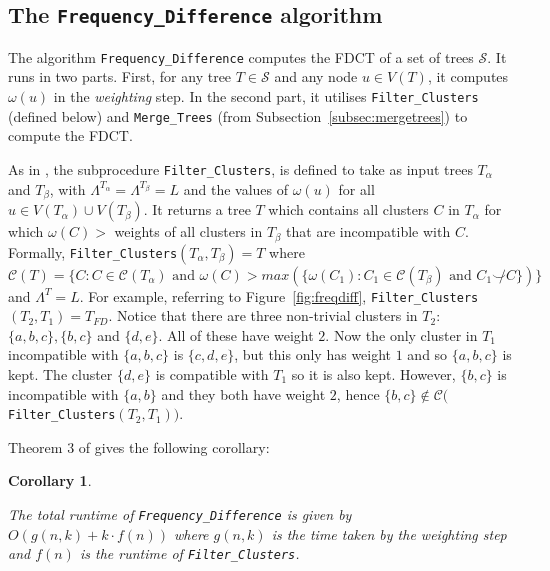 \documentclass{article}
\newcommand{\compatible}{\smile}
\newcommand{\leafset}{\Lambda}
\newcommand{\weight}{\omega}
\newcommand{\TA}{T_\alpha}
\newcommand{\TB}{T_\beta}
\newtheorem{freqdiffruntimecomponents}[incompatibility]{Corollary}
\begin{document}
    \subsection{The \texttt{Frequency\_Difference} algorithm}

    The algorithm \texttt{Frequency\_Difference} \cite{jansson2018algorithms} computes the FDCT of a set of trees $\mathcal{S}$. It runs in two parts. First, for any tree $T \in \mathcal{S}$ and any node $u \in V(T)$, it computes $\weight(u)$ in the \textit{weighting} step. In the second part, it utilises \texttt{Filter\_Clusters} (defined below) and \texttt{Merge\_Trees} (from Subsection~\ref{subsec:mergetrees}) to compute the FDCT.

    As in \cite{jansson2018algorithms}, the subprocedure \texttt{Filter\_Clusters}, is defined to take as input trees $\TA$ and $\TB$, with $\leafset^{\TA} = \leafset^{\TB} = L$ and the values of $\weight(u)$ for all $u \in V(\TA) \cup V(\TB)$. It returns a tree $T$ which contains all clusters $C$ in $\TA$ for which $\weight(C) > $ weights of all clusters in $\TB$ that are incompatible with $C$. Formally, \texttt{Filter\_Clusters}$(\TA, \TB) = T$ where $\mathcal{C}(T) = \{C : C \in \mathcal{C}(\TA) \text{ and } \weight(C) > max(\{\weight(C_1) : C_1 \in \mathcal{C}(\TB) \text{ and } C_1 \not\compatible C\})\}$ and $\leafset^T = L$. For example, referring to Figure~\ref{fig:freqdiff}, \texttt{Filter\_Clusters}$(T_2, T_1) = T_{FD}$. Notice that there are three non-trivial clusters in $T_2$: $\{a, b, c\}, \{b, c\}$ and $\{d, e\}$. All of these have weight $2$. Now the only cluster in $T_1$ incompatible with $\{a, b, c\}$ is $\{c, d, e\}$, but this only has weight $1$ and so $\{a, b, c\}$ is kept. The cluster $\{d, e\}$ is compatible with $T_1$ so it is also kept. However, $\{b, c\}$ is incompatible with $\{a, b\}$ and they both have weight $2$, hence $\{b, c\} \not\in \mathcal{C}($\texttt{Filter\_Clusters}$(T_2, T_1))$.

    Theorem 3 of \cite{jansson2018algorithms} gives the following corollary:
    \newline

    \begin{freqdiffruntimecomponents}
        \label{cor:freqdiffruntimecomponents}

        The total runtime of \texttt{Frequency\_Difference} is given by $O(g(n, k) + k \cdot f(n))$ where $g(n, k)$ is the time taken by the weighting step and $f(n)$ is the runtime of \texttt{Filter\_Clusters}.
    \end{freqdiffruntimecomponents}
\end{document}
